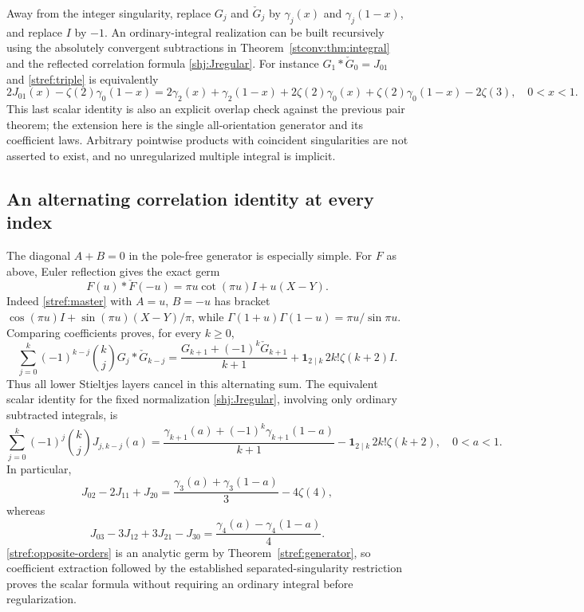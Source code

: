 Away from the integer singularity, replace $G_j$ and $\check G_j$
by $\gamma_j(x)$ and $\gamma_j(1-x)$, and replace $I$ by $-1$.
An ordinary-integral realization can be built recursively using the
absolutely convergent subtractions in Theorem~\ref{stconv:thm:integral}
and the reflected correlation formula \eqref{shj:Jregular}.
For instance $G_1*\check G_0=J_{01}$ and
\eqref{stref:triple} is equivalently
\[
 2J_{01}(x)-\zeta(2)\gamma_0(1-x)
  =2\gamma_2(x)+\gamma_2(1-x)+2\zeta(2)\gamma_0(x)
    +\zeta(2)\gamma_0(1-x)-2\zeta(3),\quad 0<x<1.
\]
This last scalar identity is also an explicit overlap check against the
previous pair theorem; the extension here is the single all-orientation
generator and its coefficient laws. Arbitrary pointwise products with
coincident singularities are not asserted to exist, and no unregularized
multiple integral is implicit.

\subsection{An alternating correlation identity at every index}
The diagonal $A+B=0$ in the pole-free generator is especially simple.
For $F$ as above, Euler reflection gives the exact germ
\begin{equation}\label{stref:opposite-orders}
 F(u)*\check F(-u)=\pi u\cot(\pi u)I+u(X-Y).
\end{equation}
Indeed \eqref{stref:master} with $A=u$, $B=-u$ has bracket
$\cos(\pi u)I+\sin(\pi u)(X-Y)/\pi$, while
$\Gamma(1+u)\Gamma(1-u)=\pi u/\sin\pi u$.
Comparing coefficients proves, for every $k\ge0$,
\begin{equation}\label{stref:alternating}
 \sum_{j=0}^k(-1)^{k-j}\binom{k}{j}G_j*\check G_{k-j}
 =\frac{G_{k+1}+(-1)^k\check G_{k+1}}{k+1}
   +\mathbf1_{2\mid k}\,2k!\zeta(k+2)I.
\end{equation}
Thus all lower Stieltjes layers cancel in this alternating sum.
The equivalent scalar identity for the fixed normalization
\eqref{shj:Jregular}, involving only ordinary subtracted integrals, is
\begin{equation}\label{stref:alternating-scalar}
 \boxed{\displaystyle
 \sum_{j=0}^k(-1)^j\binom{k}{j}J_{j,k-j}(a)
 =\frac{\gamma_{k+1}(a)+(-1)^k\gamma_{k+1}(1-a)}{k+1}
  -\mathbf1_{2\mid k}\,2k!\zeta(k+2),\quad 0<a<1.}
\end{equation}
In particular,
\[
 J_{02}-2J_{11}+J_{20}
 =\frac{\gamma_3(a)+\gamma_3(1-a)}3-4\zeta(4),
\]
whereas
\[
 J_{03}-3J_{12}+3J_{21}-J_{30}
 =\frac{\gamma_4(a)-\gamma_4(1-a)}4.
\]
\eqref{stref:opposite-orders} is an analytic germ by
Theorem~\ref{stref:generator}, so coefficient extraction followed by
the established separated-singularity restriction proves the scalar
formula without requiring an ordinary integral before regularization.

